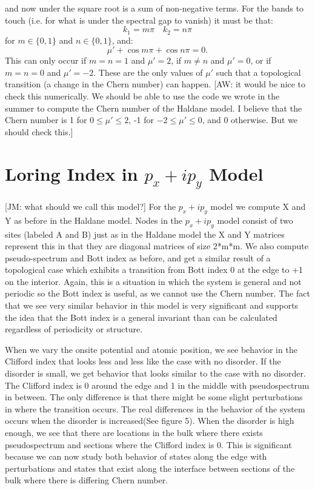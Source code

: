 \documentclass[a4paper]{article}
\newcommand{\aw}[1]{{\color{blue} [AW: #1]}}
\newcommand{\jm}[1]{{\color{red} [JM: #1]}}
\begin{document}
and now under the square root is a sum of non-negative terms. For the bands to touch (i.e. for what is under the spectral gap to vanish) it must be that:
\begin{equation}
	k_1 = m \pi \quad k_2 = n \pi
\end{equation}
for $m \in \{0,1\}$ and $n \in \{0,1\}$, and:
\begin{equation}
	\mu' + \cos m \pi + \cos n \pi = 0.
\end{equation}
This can only occur if $m = n = 1$ and $\mu' = 2$, if $m \neq n$ and $\mu' = 0$, or if $m = n = 0$ and $\mu' = - 2$. These are the only values of $\mu'$ such that a topological transition (a change in the Chern number) can happen. \aw{it would be nice to check this numerically. We should be able to use the code we wrote in the summer to compute the Chern number of the Haldane model. I believe that the Chern number is 1 for $0 \leq \mu' \leq 2$, -1 for $- 2 \leq \mu' \leq 0$, and 0 otherwise. But we should check this.}

\section{Loring Index in \texorpdfstring{$p_x + ip_y$}{px + ipy} Model}
\jm{what should we call this model?}
For the \texorpdfstring{$p_x + ip_y$}{px + ipy} model we compute X and Y as before in the Haldane model. Nodes in the \texorpdfstring{$p_x + ip_y$}{px + ipy} model consist of two sites (labeled A and B) just as in the Haldane model the X and Y matrices represent this in that they are diagonal matrices of size 2*m*m. We also compute pseudo-spectrum and Bott index as before, and get a similar result of a topological case which exhibits a transition from Bott index 0 at the edge to +1 on the interior. Again, this is a situation in which the system is general and not periodic so the Bott index is useful, as we cannot use the Chern number. The fact that we see very similar behavior in this model is very significant and supports the idea that the Bott index is a general invariant than can be calculated regardless of periodicity or structure.

When we vary the onsite potential and atomic position, we see behavior in the Clifford index that looks less and less like the case with no disorder. If the disorder is small, we get behavior that looks similar to the case with no disorder. The Clifford index is 0 around the edge and 1 in the middle with pseudospectrum in between. The only difference is that there might be some slight perturbations in where the transition occurs. The real differences in the behavior of the system occurs when the disorder is increased(See figure 5). When the disorder is high enough, we see that there are locations in the bulk where there exists pseudospectrum and sections where the Clifford index is 0. This is significant because we can now study both behavior of states along the edge with perturbations and states that exist along the interface between sections of the bulk where there is differing Chern number.
\end{document}
